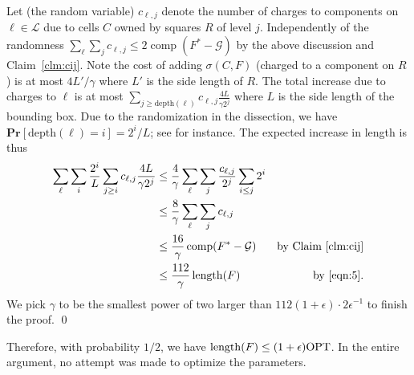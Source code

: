 \documentclass[extras,11pt]{article} \usepackage{fullpage}
\theoremstyle{mytheorem}
\newenvironment{proofof}[1]{\par\noindent{\bf #1.}\hspace{0.5em}}
    {\hfill\qed\vspace{1ex}}
\DeclareMathOperator{\len}{length}
\DeclareMathOperator{\comp}{comp}
\newcommand{\eps}{\epsilon}
\newcommand{\G}{\mathcal{G}}
\newcommand{\eL}{\mathcal{L}}
\newcommand{\pr}{\mathbf{Pr}}
\newcommand{\OPT}{\mbox{\rm OPT}}
\begin{document}
\begin{proofof}{\proofname\ of Theorem~\ref{thm:locality}}
Let (the random variable) $c_{\ell,j}$ denote the number of charges to components on $\ell\in\eL$ due to cells $C$ owned by squares $R$ of level $j$.
Independently of the randomness $\sum_\ell\sum_j c_{\ell,j}\leq 2\comp(F^\ast-\G)$ by the above discussion and Claim~\ref{clm:cij}.
Note the cost of adding $\sigma(C,F)$ (charged to a component on $R$)
is at most $4L'/\gamma$ where $L'$ is the side length of $R$.
The total increase due to charges to $\ell$ is at most $\sum_{j\geq\text{depth}(\ell)}c_{\ell,j}\frac{4L}{\gamma 2^j}$ where $L$ is the side length of  the bounding box. Due to the randomization in the dissection, 
we have
$\pr[\text{depth}(\ell)=i]=2^i/L$; see \cite{arora98:ptas} for instance.
The expected increase in length is thus
\begin{align*}
\sum_\ell\sum_i\frac{2^i}{L}\sum_{j\geq i}c_{\ell,j}\frac{4L}{\gamma 2^j}
               &\leq\frac{4}{\gamma}\sum_\ell\sum_j\frac{c_{\ell,j}}{2^j}\sum_{i\leq j}2^i   \\
               &
\leq\frac{8}{\gamma}\sum_\ell\sum_jc_{\ell,j}  \\
              &
\leq\frac{16}{\gamma}\comp(F^\ast-\G) &\text{by Claim~\ref{clm:cij}}\\
               &\leq\frac{112}{\gamma}\len(F) &\text{by \eqref{eqn:5}}.
\end{align*}
\noindent We pick $\gamma$ to be the smallest power of two larger than $112(1+\epsilon)\cdot 2\epsilon^{-1}$
to finish the proof.
\end{proofof}

Therefore, with probability $1/2$, we have $\len(F)\leq(1+\eps)\OPT$.
In the entire argument, no attempt was made to optimize the parameters.
\end{document}
